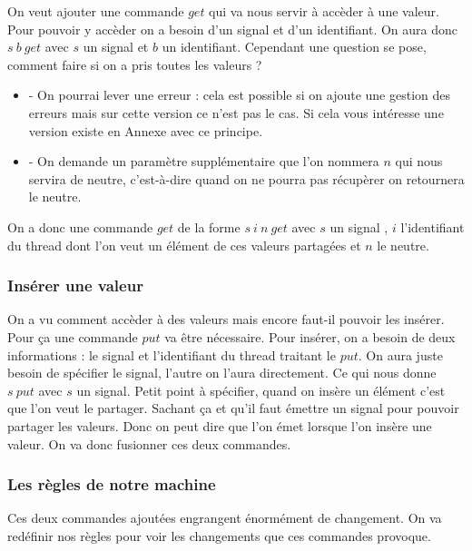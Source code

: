 \documentclass[10pt,a4paper]{article}
\begin{document}
				On veut ajouter une commande $get$ qui va nous servir à accèder à une valeur. Pour pouvoir y accèder on a besoin d'un signal et d'un identifiant. On aura donc $s~b~get$ avec $s$ un signal et $b$ un identifiant. Cependant une question se pose, comment faire si on a pris toutes les valeurs ? 
				\smallbreak
				\begin{itemize}
					\item[] - On pourrai lever une erreur : cela est possible si on ajoute une gestion des erreurs mais sur cette version ce n'est pas le cas. Si cela vous intéresse une version existe en Annexe avec ce principe.
					\item[] - On demande un paramètre supplémentaire que l'on nommera $n$ qui nous servira de neutre, c'est-à-dire quand on ne pourra pas récupèrer on retournera le neutre.
				\end{itemize} 
				\smallbreak
				On a donc une commande $get$ de la forme $s~i~n~get$ avec $s$ un signal , $i$ l'identifiant du thread dont l'on veut un élément de ces valeurs partagées et $n$ le neutre. 
				\bigbreak
				
				
			\subsubsection{Insérer une valeur}
			
				On a vu comment accèder à des valeurs mais encore faut-il pouvoir les insérer. Pour ça une commande $put$ va être nécessaire. Pour insérer, on a besoin de deux informations : le signal et l'identifiant du thread traitant le $put$. On aura juste besoin de spécifier le signal, l'autre on l'aura directement. Ce qui nous donne $s~put$ avec $s$ un signal. 
				\smallbreak
				Petit point à spécifier, quand on insère un élément c'est que l'on veut le partager. Sachant ça et qu'il faut émettre un signal pour pouvoir partager les valeurs. Donc on peut dire que l'on émet lorsque l'on insère une valeur. On va donc fusionner ces deux commandes. 
				\bigbreak
				\bigbreak
					
			
			
			
			\subsubsection{Les règles de notre machine}
				
				Ces deux commandes ajoutées engrangent énormément de changement. On va redéfinir nos règles pour voir les changements que ces commandes provoque. 
				\bigbreak
		
\end{document}
